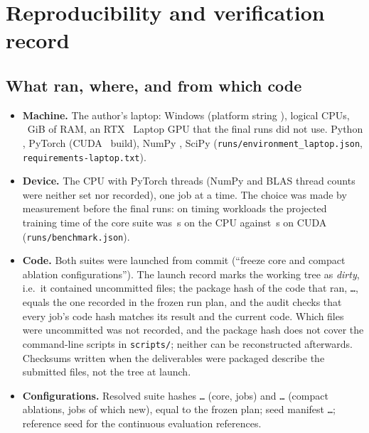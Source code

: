 \section{Reproducibility and verification record}\label{app:repro}

\subsection{What ran, where, and from which code}

\begin{itemize}[nosep]
\item \textbf{Machine.} The author's laptop: Windows (platform string \texttt{}),  logical CPUs, ~GiB of RAM, an RTX~ Laptop GPU that the final runs did not use. Python , PyTorch  (CUDA~ build), NumPy , SciPy  (\texttt{runs/environment\_laptop.json}, \texttt{requirements-laptop.txt}).
\item \textbf{Device.} The CPU with  PyTorch threads (NumPy and BLAS thread counts were neither set nor recorded), one job at a time. The choice was made by measurement before the final runs: on timing workloads the projected training time of the core suite was \,s on the CPU against \,s on CUDA (\texttt{runs/benchmark.json}).
\item \textbf{Code.} Both suites were launched from commit \texttt{} (``freeze core and compact ablation configurations''). The launch record marks the working tree as \emph{dirty}, i.e.\ it contained uncommitted files; the package hash of the code that ran, \texttt{\ldots}, equals the one recorded in the frozen run plan, and the audit checks that every job's code hash matches its result and the current code. Which files were uncommitted was not recorded, and the package hash does not cover the command-line scripts in \texttt{scripts/}; neither can be reconstructed afterwards. Checksums written when the deliverables were packaged describe the submitted files, not the tree at launch.
\item \textbf{Configurations.} Resolved suite hashes \texttt{\ldots} (core,  jobs) and \texttt{\ldots} (compact ablations,  jobs of which  new), equal to the frozen plan; seed manifest \texttt{\ldots}; reference seed  for the continuous evaluation references.

\end{itemize}

